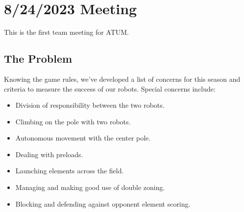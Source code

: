 \section{8/24/2023 Meeting}
This is the first team meeting for ATUM.

\subsection{The Problem}
Knowing the game rules, we've developed a list of concerns for this season
and criteria to measure the success of our robots.
Special concerns include:
\begin{itemize}
    \item Division of responsibility between the two robots.
    \item Climbing on the pole with two robots.
    \item Autonomous movement with the center pole.
    \item Dealing with preloads.
    \item Launching elements across the field.
    \item Managing and making good use of double zoning.
    \item Blocking and defending against opponent element scoring.
\end{itemize}